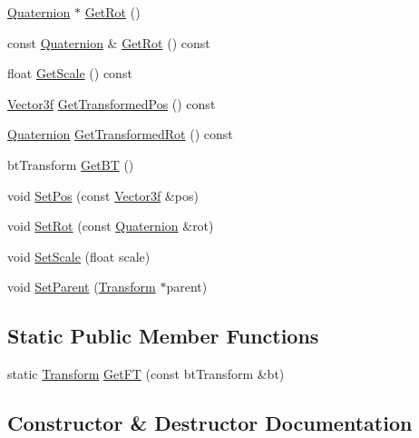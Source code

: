 \begin{DoxyCompactItemize}
\item 
\hyperlink{class_quaternion}{Quaternion} $\ast$ \hyperlink{class_transform_a03dca2b481f971cfbf5f7b64dbe5459a}{Get\+Rot} ()
\item 
const \hyperlink{class_quaternion}{Quaternion} \& \hyperlink{class_transform_a830cca54760ecf980ebfc1ee5ac19200}{Get\+Rot} () const 
\item 
float \hyperlink{class_transform_a70d9b20871d36066d4144173044dfa5f}{Get\+Scale} () const 
\item 
\hyperlink{class_vector3f}{Vector3f} \hyperlink{class_transform_aaa07e1fe04771f89f839b325e8bfcc4c}{Get\+Transformed\+Pos} () const 
\item 
\hyperlink{class_quaternion}{Quaternion} \hyperlink{class_transform_a8bbae69612f3cd53c001d8dd00275e35}{Get\+Transformed\+Rot} () const 
\item 
bt\+Transform \hyperlink{class_transform_a91e991cd5e0e3bf4429dff1a582e2d81}{Get\+B\+T} ()
\item 
void \hyperlink{class_transform_a3a3ba4be9b592a26090dcc6d27e7bc01}{Set\+Pos} (const \hyperlink{class_vector3f}{Vector3f} \&pos)
\item 
void \hyperlink{class_transform_a859f20339cd42da87165d3146a5a922c}{Set\+Rot} (const \hyperlink{class_quaternion}{Quaternion} \&rot)
\item 
void \hyperlink{class_transform_a73296cf3be4bf21b5ac395fecd51f90c}{Set\+Scale} (float scale)
\item 
void \hyperlink{class_transform_a330267363f9085f10d1e3029b72097e7}{Set\+Parent} (\hyperlink{class_transform}{Transform} $\ast$parent)
\end{DoxyCompactItemize}
\subsection*{Static Public Member Functions}
\begin{DoxyCompactItemize}
\item 
static \hyperlink{class_transform}{Transform} \hyperlink{class_transform_a5b5ec93b4e99289c6d1a14afe7667bb7}{Get\+F\+T} (const bt\+Transform \&bt)
\end{DoxyCompactItemize}


\subsection{Constructor \& Destructor Documentation}
\hypertarget{class_transform_a5a7c897577867bcc5be0b0f5da5a325a}{}
